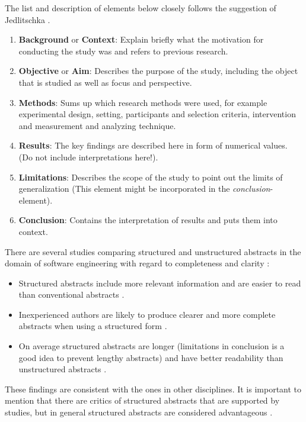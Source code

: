 The list and description of elements below closely follows the suggestion of Jedlitschka \etal \cite{Jedlitschka2008}.
\begin{enumerate}
	\item \textbf{Background} or \textbf{Context}: Explain briefly what the motivation for conducting the study was and refers to previous research.
	\item \textbf{Objective} or \textbf{Aim}: Describes the purpose of the study, including the object that is studied as well as focus and perspective. 
	\item \textbf{Methods}: Sums up which research methods were used, for example experimental design, setting, participants and selection criteria, intervention and measurement and analyzing technique.
	\item \textbf{Results}: The key findings are described here in form of numerical values.  (Do not include interpretations here!).
	\item \textbf{Limitations}: Describes the scope  of the study to point out the limits of generalization (This element might be incorporated in the \emph{conclusion}-element).
	\item \textbf{Conclusion}:  Contains the interpretation of results and puts them into context.
\end{enumerate}

There are several studies comparing structured and unstructured abstracts in the domain of software engineering with regard to completeness and clarity :

\begin{itemize}
\item Structured abstracts include more relevant information and are easier to read than conventional abstracts \cite{Budgen2007,Budgen2008}.
\item Inexperienced authors are likely to produce clearer and more complete abstracts when using a structured form \cite{Budgen2011} .
\item On average structured abstracts are longer (limitations in conclusion is a good idea to prevent lengthy abstracts) and have better readability than unstructured abstracts \cite{KBO2008}.
\end{itemize}
	
These findings are consistent with the ones in other disciplines. It is important to mention that there are critics of structured abstracts that are supported by studies, but in general structured abstracts are considered advantageous \cite{hartley2004,hartley2014}.	

